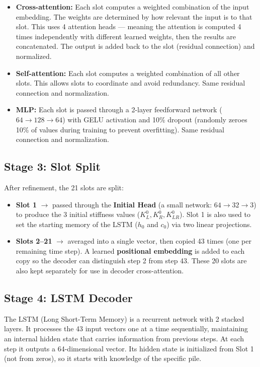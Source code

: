\documentclass[11pt,a4paper]{article}
\begin{document}
\begin{itemize}[nosep]
    \item \textbf{Cross-attention:} Each slot computes a weighted combination of the input embedding. The weights are determined by how relevant the input is to that slot. This uses 4 attention heads --- meaning the attention is computed 4 times independently with different learned weights, then the results are concatenated. The output is added back to the slot (residual connection) and normalized.
    \item \textbf{Self-attention:} Each slot computes a weighted combination of all other slots. This allows slots to coordinate and avoid redundancy. Same residual connection and normalization.
    \item \textbf{MLP:} Each slot is passed through a 2-layer feedforward network ($64 \to 128 \to 64$) with GELU activation and 10\% dropout (randomly zeroes 10\% of values during training to prevent overfitting). Same residual connection and normalization.
\end{itemize}

\subsection*{Stage 3: Slot Split}
After refinement, the 21 slots are split:
\begin{itemize}[nosep]
    \item \textbf{Slot 1} $\to$ passed through the \textbf{Initial Head} (a small network: $64 \to 32 \to 3$) to produce the 3 initial stiffness values ($K_L^0, K_R^0, K_{LR}^0$). Slot 1 is also used to set the starting memory of the LSTM ($h_0$ and $c_0$) via two linear projections.
    \item \textbf{Slots 2--21} $\to$ averaged into a single vector, then copied 43 times (one per remaining time step). A learned \textbf{positional embedding} is added to each copy so the decoder can distinguish step 2 from step 43. These 20 slots are also kept separately for use in decoder cross-attention.
\end{itemize}

\subsection*{Stage 4: LSTM Decoder}
The LSTM (Long Short-Term Memory) is a recurrent network with 2 stacked layers. It processes the 43 input vectors one at a time sequentially, maintaining an internal hidden state that carries information from previous steps. At each step it outputs a 64-dimensional vector. Its hidden state is initialized from Slot 1 (not from zeros), so it starts with knowledge of the specific pile.
\end{document}
